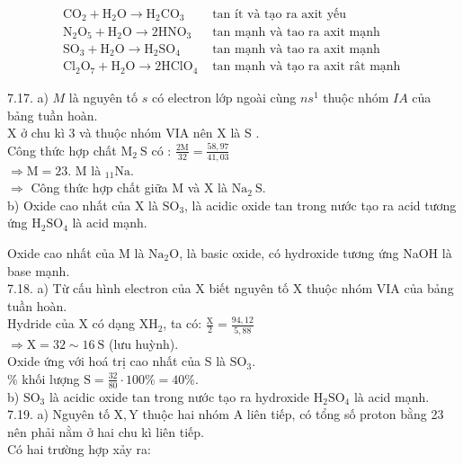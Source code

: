 \documentclass[10pt]{article}
\begin{document}
$$
\begin{array}{ll}
\mathrm{CO}_{2}+\mathrm{H}_{2} \mathrm{O} \rightarrow \mathrm{H}_{2} \mathrm{CO}_{3} & \text { tan ít và tạo ra axit yếu } \\
\mathrm{N}_{2} \mathrm{O}_{5}+\mathrm{H}_{2} \mathrm{O} \rightarrow 2 \mathrm{HNO}_{3} & \text { tan mạnh và tao ra axit mạnh } \\
\mathrm{SO}_{3}+\mathrm{H}_{2} \mathrm{O} \rightarrow \mathrm{H}_{2} \mathrm{SO}_{4} & \text { tan mạnh và tao ra axit mạnh } \\
\mathrm{Cl}_{2} \mathrm{O}_{7}+\mathrm{H}_{2} \mathrm{O} \rightarrow 2 \mathrm{HClO}_{4} & \text { tan mạnh và tạo ra axit rât mạnh }
\end{array}
$$

7.17. a) $M$ là nguyên tố $s$ có electron lớp ngoài cùng $n s^{1}$ thuộc nhóm $I A$ của bảng tuần hoàn.\\
X ở chu kì 3 và thuộc nhóm VIA nên X là S .\\
Công thức hợp chất $\mathrm{M}_{2} \mathrm{~S}$ có : $\frac{2 \mathrm{M}}{32}=\frac{58,97}{41,03}$\\
$\Rightarrow \mathrm{M}=23$. M là ${ }_{11} \mathrm{Na}$.\\
$\Rightarrow$ Công thức hợp chất giữa M và X là $\mathrm{Na}_{2} \mathrm{~S}$.\\
b) Oxide cao nhất của X là $\mathrm{SO}_{3}$, là acidic oxide tan trong nước tạo ra acid tương ứng $\mathrm{H}_{2} \mathrm{SO}_{4}$ là acid mạnh.

Oxide cao nhất của M là $\mathrm{Na}_{2} \mathrm{O}$, là basic oxide, có hydroxide tương ứng NaOH là base mạnh.\\
7.18. a) Từ cấu hình electron của X biết nguyên tố X thuộc nhóm VIA của bảng tuần hoàn.\\
Hydride của X có dạng $\mathrm{XH}_{2}$, ta có: $\frac{\mathrm{X}}{2}=\frac{94,12}{5,88}$\\
$\Rightarrow \mathrm{X}=32 \sim 16 \mathrm{~S}$ (lưu huỳnh).\\
Oxide ứng với hoá trị cao nhất của S là $\mathrm{SO}_{3}$.\\
\% khối lượng $\mathrm{S}=\frac{32}{80} \cdot 100 \%=40 \%$.\\
b) $\mathrm{SO}_{3}$ là acidic oxide tan trong nước tạo ra hydroxide $\mathrm{H}_{2} \mathrm{SO}_{4}$ là acid mạnh.\\
7.19. a) Nguyên tố $\mathrm{X}, \mathrm{Y}$ thuộc hai nhóm A liên tiếp, có tổng số proton bằng 23 nên phải nằm ở hai chu kì liên tiếp.\\
Có hai trường hợp xảy ra:
\end{document}

